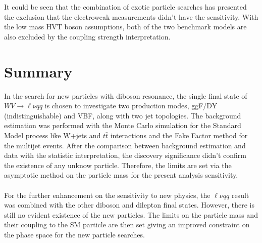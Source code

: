 \noindent
\\
\\It could be seen that the combination of exotic particle searches has presented the exclusion that the electroweak measurements didn't have the sensitivity. With the low mass HVT boson assumptions, both of the two benchmark models are also excluded by the coupling strength interpretation.
\section{Summary}
In the search for new particles with diboson resonance, the single final state of $WV\to\ell\nu qq$ is chosen to investigate two production modes, ggF/DY (indistinguishable) and VBF, along with two jet topologies. The background estimation was performed with the Monte Carlo simulation for the Standard Model process like W+jets and $t\bar{t}$ interactions and the Fake Factor method for the multijet events. After the comparison between background estimation and data with the statistic interpretation, the discovery significance didn't confirm the existence of any unknow particle. Therefore, the limits are set via the asymptotic method on the particle mass for the present analysis sensitivity. 
\\
\\For the further enhancement on the sensitivity to new physics, the $\ell\nu qq$ result was combined with the other diboson and dilepton final states. However, there is still no evident existence of the new particles. The limits on the particle mass and their coupling to the SM particle are then set giving an improved constraint on the phase space for the new particle searches.  